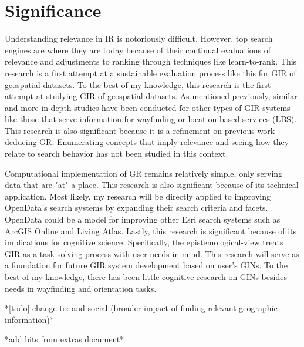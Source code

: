 \chapter{Significance} \label{ch:[chapter 6 label]}

Understanding relevance in IR is notoriously difficult. However, top search engines are where they are today because of their continual evaluations of relevance and adjustments to ranking through techniques like learn-to-rank. This research is a first attempt at a sustainable evaluation process like this for GIR of geospatial datasets. To the best of my knowledge, this research is the first attempt at studying GIR of geospatial datasets. As mentioned previously, similar and more in depth studies have been conducted for other types of GIR systems like those that serve information for wayfinding or location based services (LBS). This research is also significant because it is a refinement on previous work deducing GR. Enumerating concepts that imply relevance and seeing how they relate to search behavior has not been studied in this context.

Computational implementation of GR remains relatively simple, only serving data that are "at" a place. This research is also significant because of its technical application. Most likely, my research will be directly applied to improving OpenData’s search systems by expanding their search criteria and facets. OpenData could be a model for improving other Esri search systems such as ArcGIS Online and Living Atlas. Lastly, this research is significant because of its implications for cognitive science. Specifically, the epistemological-view treats GIR as a task-solving process with user needs in mind. This research will serve as a foundation for future GIR system development based on user’s GINs. To the best of my knowledge, there has been little cognitive research on GINs besides needs in wayfinding and orientation tasks.

*[todo] change to: and social (broader impact of finding relevant geographic information)*

*add bits from extras document*